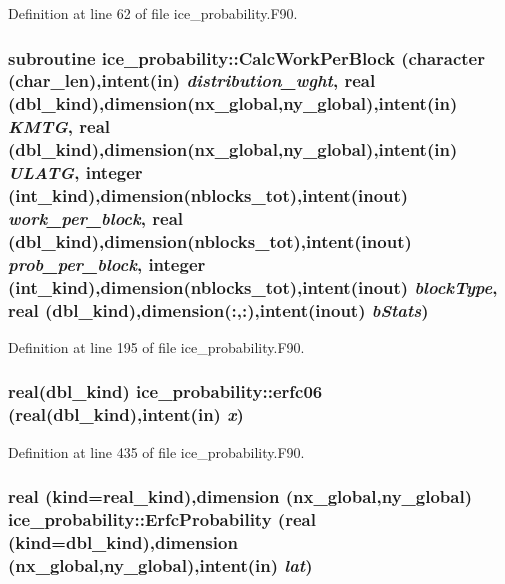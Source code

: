 Definition at line 62 of file ice\_\-probability.F90.\hypertarget{namespaceice__probability_ab5d1ecab27a5c7e3ba4a1fc39af3adcc}{
\subsubsection[{CalcWorkPerBlock}]{\setlength{\rightskip}{0pt plus 5cm}subroutine ice\_\-probability::CalcWorkPerBlock (character (char\_\-len),intent(in) {\em distribution\_\-wght}, \/  real (dbl\_\-kind),dimension(nx\_\-global,ny\_\-global),intent(in) {\em KMTG}, \/  real (dbl\_\-kind),dimension(nx\_\-global,ny\_\-global),intent(in) {\em ULATG}, \/  integer (int\_\-kind),dimension(nblocks\_\-tot),intent(inout) {\em work\_\-per\_\-block}, \/  real (dbl\_\-kind),dimension(nblocks\_\-tot),intent(inout) {\em prob\_\-per\_\-block}, \/  integer (int\_\-kind),dimension(nblocks\_\-tot),intent(inout) {\em blockType}, \/  real (dbl\_\-kind),dimension(:,:),intent(inout) {\em bStats})}}
\label{namespaceice__probability_ab5d1ecab27a5c7e3ba4a1fc39af3adcc}


Definition at line 195 of file ice\_\-probability.F90.\hypertarget{namespaceice__probability_af2adb80d8ffb5383c91ab49ece3f2832}{
\subsubsection[{erfc06}]{\setlength{\rightskip}{0pt plus 5cm}real(dbl\_\-kind) ice\_\-probability::erfc06 (real(dbl\_\-kind),intent(in) {\em x})}}
\label{namespaceice__probability_af2adb80d8ffb5383c91ab49ece3f2832}


Definition at line 435 of file ice\_\-probability.F90.\hypertarget{namespaceice__probability_a46608f3ec8b2296b8d5fac3dc7822255}{
\subsubsection[{ErfcProbability}]{\setlength{\rightskip}{0pt plus 5cm}real (kind=real\_\-kind),dimension (nx\_\-global,ny\_\-global) ice\_\-probability::ErfcProbability (real (kind=dbl\_\-kind),dimension (nx\_\-global,ny\_\-global),intent(in) {\em lat})}}
\label{namespaceice__probability_a46608f3ec8b2296b8d5fac3dc7822255}


